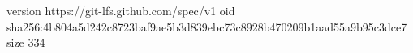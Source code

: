 version https://git-lfs.github.com/spec/v1
oid sha256:4b804a5d242c8723baf9ae5b3d839ebc73c8928b470209b1aad55a9b95c3dce7
size 334
